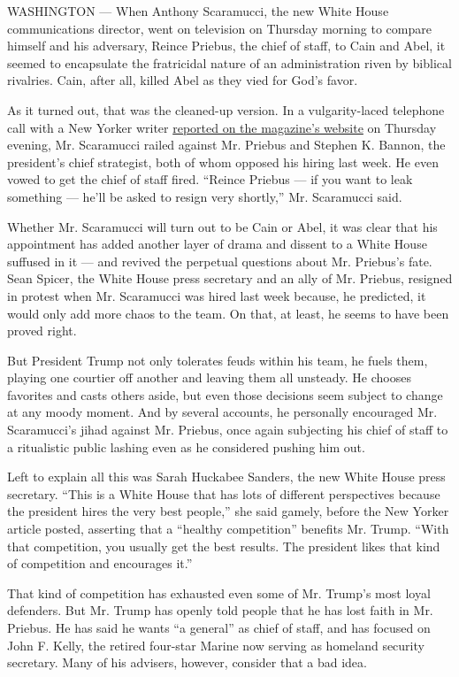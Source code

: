 WASHINGTON --- When Anthony Scaramucci, the new White House
communications director, went on television on Thursday morning to
compare himself and his adversary, Reince Priebus, the chief of staff,
to Cain and Abel, it seemed to encapsulate the fratricidal nature of an
administration riven by biblical rivalries. Cain, after all, killed Abel
as they vied for God's favor.

As it turned out, that was the cleaned-up version. In a vulgarity-laced
telephone call with a New Yorker writer
\href{http://www.newyorker.com/news/ryan-lizza/anthony-scaramucci-called-me-to-unload-about-white-house-leakers-reince-priebus-and-steve-bannon}{reported
on the magazine's website} on Thursday evening, Mr. Scaramucci railed
against Mr. Priebus and Stephen K. Bannon, the president's chief
strategist, both of whom opposed his hiring last week. He even vowed to
get the chief of staff fired. ``Reince Priebus --- if you want to leak
something --- he'll be asked to resign very shortly,'' Mr. Scaramucci
said.

Whether Mr. Scaramucci will turn out to be Cain or Abel, it was clear
that his appointment has added another layer of drama and dissent to a
White House suffused in it --- and revived the perpetual questions about
Mr. Priebus's fate. Sean Spicer, the White House press secretary and an
ally of Mr. Priebus, resigned in protest when Mr. Scaramucci was hired
last week because, he predicted, it would only add more chaos to the
team. On that, at least, he seems to have been proved right.

But President Trump not only tolerates feuds within his team, he fuels
them, playing one courtier off another and leaving them all unsteady. He
chooses favorites and casts others aside, but even those decisions seem
subject to change at any moody moment. And by several accounts, he
personally encouraged Mr. Scaramucci's jihad against Mr. Priebus, once
again subjecting his chief of staff to a ritualistic public lashing even
as he considered pushing him out.

Left to explain all this was Sarah Huckabee Sanders, the new White House
press secretary. ``This is a White House that has lots of different
perspectives because the president hires the very best people,'' she
said gamely, before the New Yorker article posted, asserting that a
``healthy competition'' benefits Mr. Trump. ``With that competition, you
usually get the best results. The president likes that kind of
competition and encourages it.''

That kind of competition has exhausted even some of Mr. Trump's most
loyal defenders. But Mr. Trump has openly told people that he has lost
faith in Mr. Priebus. He has said he wants ``a general'' as chief of
staff, and has focused on John F. Kelly, the retired four-star Marine
now serving as homeland security secretary. Many of his advisers,
however, consider that a bad idea.

